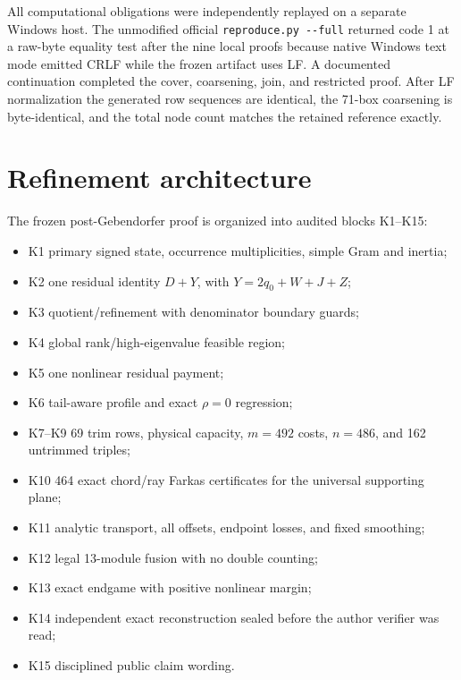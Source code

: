 \documentclass[11pt]{article}
\begin{document}
All computational obligations were independently replayed on a separate Windows host.
The unmodified official \texttt{reproduce.py -{}-full} returned code 1 at a raw-byte equality
test after the nine local proofs because native Windows text mode emitted CRLF while the frozen
artifact uses LF. A documented continuation completed the cover, coarsening, join, and restricted
proof. After LF normalization the generated row sequences are identical, the 71-box coarsening
is byte-identical, and the total node count matches the retained reference exactly.

\section{Refinement architecture}
The frozen post-Gebendorfer proof is organized into audited blocks K1--K15:
\begin{itemize}
\item K1 primary signed state, occurrence multiplicities, simple Gram and inertia;
\item K2 one residual identity $D+Y$, with $Y=2q_0+W+J+Z$;
\item K3 quotient/refinement with denominator boundary guards;
\item K4 global rank/high-eigenvalue feasible region;
\item K5 one nonlinear residual payment;
\item K6 tail-aware profile and exact $\rho=0$ regression;
\item K7--K9 69 trim rows, physical capacity, $m=492$ costs, $n=486$, and 162 untrimmed triples;
\item K10 464 exact chord/ray Farkas certificates for the universal supporting plane;
\item K11 analytic transport, all offsets, endpoint losses, and fixed smoothing;
\item K12 legal 13-module fusion with no double counting;
\item K13 exact endgame with positive nonlinear margin;
\item K14 independent exact reconstruction sealed before the author verifier was read;
\item K15 disciplined public claim wording.
\end{itemize}
\end{document}
